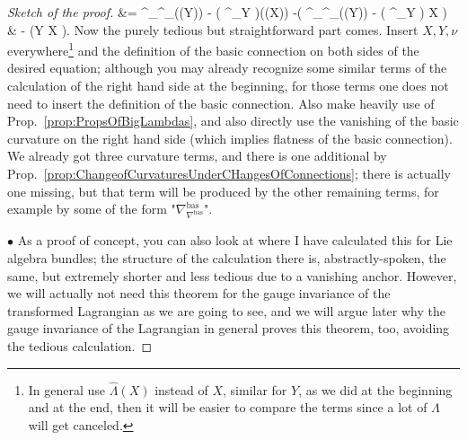 \begin{proof}[Sketch of the proof]
&=
\nabla^{}_{\nabla^{}_{\nu}(\lambda(Y)) - \lambda\mleft( \nabla^{}_\nu Y \mright)}\bigl(\lambda(X)\bigr)
	-\lambda\mleft(
		\nabla^{}_{\nabla^{}_{\nu}(\lambda(Y)) - \lambda\mleft( \nabla^{}_\nu Y \mright)} X
	\mright)
\\
&\hspace{1cm}
	- (Y \leftrightarrow X ).
\eas
Now the purely tedious but straightforward part comes. Insert $X, Y, \nu$ everywhere\footnote{In general use $\widehat{\Lambda}(X)$ instead of $X$, similar for $Y$, as we did at the beginning and at the end, then it will be easier to compare the terms since a lot of $\Lambda$ will get canceled.} and the definition of the basic connection on both sides of the desired equation; although you may already recognize some similar terms of the calculation of the right hand side at the beginning, for those terms one does not need to insert the definition of the basic connection. Also make heavily use of Prop.~\ref{prop:PropsOfBigLambdas}, and also directly use the vanishing of the basic curvature on the right hand side (which implies flatness of the basic connection). We already got three curvature terms, and there is one additional by Prop.~\ref{prop:ChangeofCurvaturesUnderCHangesOfConnections}; there is actually one missing, but that term will be produced by the other remaining terms, for example by some of the form "$\nabla^{\mathrm{bas}}_{\nabla^{\mathrm{bas}}}$".

$\bullet$ As a proof of concept, you can also look at \cite[proof of Theorem 3.6, the first equation for the transformed curvature there]{My1stpaper} where I have calculated this for Lie algebra bundles; the structure of the calculation there is, abstractly-spoken, the same, but extremely shorter and less tedious due to a vanishing anchor. However, we will actually not need this theorem for the gauge invariance of the transformed Lagrangian as we are going to see, and we will argue later why the gauge invariance of the Lagrangian in general proves this theorem, too, avoiding the tedious calculation.
\end{proof}


